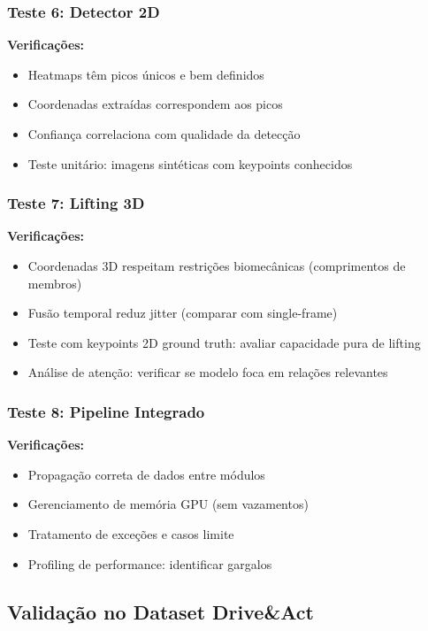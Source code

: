 \documentclass[12pt, a4paper]{article}
\begin{document}
\subsubsection{Teste 6: Detector 2D}

\textbf{Verificações:}
\begin{itemize}
    \item Heatmaps têm picos únicos e bem definidos
    \item Coordenadas extraídas correspondem aos picos
    \item Confiança correlaciona com qualidade da detecção
    \item Teste unitário: imagens sintéticas com keypoints conhecidos
\end{itemize}

\subsubsection{Teste 7: Lifting 3D}

\textbf{Verificações:}
\begin{itemize}
    \item Coordenadas 3D respeitam restrições biomecânicas (comprimentos de membros)
    \item Fusão temporal reduz jitter (comparar com single-frame)
    \item Teste com keypoints 2D ground truth: avaliar capacidade pura de lifting
    \item Análise de atenção: verificar se modelo foca em relações relevantes
\end{itemize}

\subsubsection{Teste 8: Pipeline Integrado}

\textbf{Verificações:}
\begin{itemize}
    \item Propagação correta de dados entre módulos
    \item Gerenciamento de memória GPU (sem vazamentos)
    \item Tratamento de exceções e casos limite
    \item Profiling de performance: identificar gargalos
\end{itemize}

\subsection{Validação no Dataset Drive\&Act}
\end{document}
